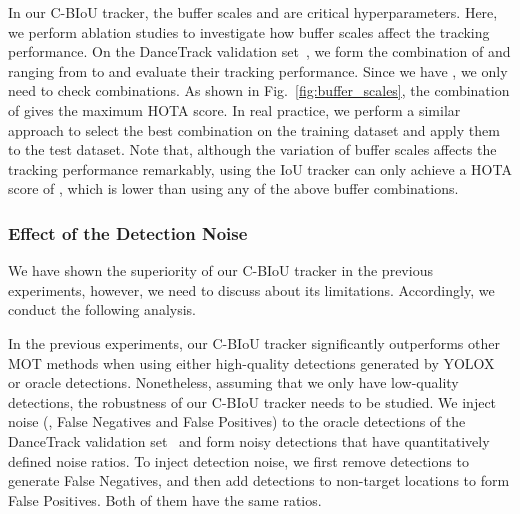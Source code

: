 \documentclass[journal]{IEEEtran}
\begin{document}
In our C-BIoU tracker, the buffer scales  and  are critical hyperparameters. Here, we perform ablation studies to investigate how buffer scales affect the tracking performance. 
On the DanceTrack validation set~\cite{sun2022dancetrack}, we form the combination of  and  ranging from  to  and evaluate their tracking performance. Since we have , we only need to check  combinations. As shown in Fig.~\ref{fig:buffer_scales}, the combination of  gives the maximum HOTA score. In real practice, we perform a similar approach to select the best combination on the training dataset and apply them to the test dataset. Note that, although the variation of buffer scales affects the tracking performance remarkably, using the IoU tracker can only achieve a HOTA score of , which is lower than using any of the above buffer combinations.






\subsubsection{Effect of the Detection Noise}
\label{sec:effect_detection_noise}

We have shown the superiority of our C-BIoU tracker in the previous experiments, however, we need to discuss about its limitations. Accordingly, we conduct the following analysis. 

In the previous experiments, our C-BIoU tracker significantly outperforms other MOT methods when using either high-quality detections generated by YOLOX~\cite{ge2021yolox} or oracle detections. Nonetheless, assuming that we only have low-quality detections, the robustness of our C-BIoU tracker needs to be studied. 
We inject noise (\ie, False Negatives and False Positives) to the oracle detections of the DanceTrack validation set~\cite{sun2022dancetrack} and form noisy detections that have quantitatively defined noise ratios. To inject detection noise, we first remove detections to generate False Negatives, and then add detections to non-target locations to form False Positives. Both of them have the same ratios. 
\end{document}
